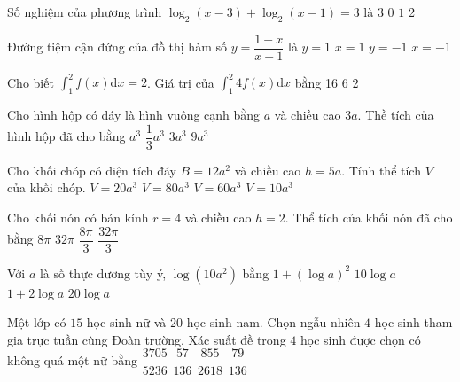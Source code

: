 \begin{ex} %
 Số nghiệm của phương trình $\log _{2}(x-3)+\log _{2}(x-1)=3$ là
\choice
{3}
{0}
{\True $1$}
{2}
\end{ex}

\begin{ex} %
 Đường tiệm cận đứng của đồ thị hàm số $y=\dfrac{1-x}{x+1}$ là
\choice
{$y=1$}
{$x=1$}
{$y=-1$}
{\True$x=-1$}
\end{ex}

\begin{ex} %
 Cho biết $\int_{1}^{2} f(x) \mathrm{d} x=2$. Giá trị của $\int_{1}^{2} 4 f(x) \mathrm{d} x$ bằng
\choice
{}
{16}
{6}
{2}
\end{ex}

\begin{ex} %
 Cho hình hộp có đáy là hình vuông cạnh bằng $a$ và chiều cao $3 a$. Thề tích của hình hộp đã cho bằng
\choice
{$a^{3}$}
{$\dfrac{1}{3} a^{3}$}
{\True $3 a^{3}$}
{$9 a^{3}$}
\end{ex}

\begin{ex} %
 Cho khối chóp có diện tích đáy $B=12 a^{2}$ và chiều cao $h=5 a$. Tính thể tích $V$ của khối chóp.
\choice
{\True $V=20 a^{3}$}
{$V=80 a^{3}$}
{$V=60 a^{3}$}
{$V=10 a^{3}$}
\end{ex}

\begin{ex} %
 Cho khối nón có bán kính $r=4$ và chiều cao $h=2$. Thể tích của khối nón đã cho bằng
\choice
{$8 \pi$}
{$32 \pi$}
{$\dfrac{8 \pi}{3}$}
{\True$\dfrac{32 \pi}{3}$}
\end{ex}

\begin{ex} %
 Với $a$ là số thực dương tùy ý, $\log \left(10 a^{2}\right)$ bằng
\choice
{$1+(\log a)^{2}$}
{$10 \log a$}
{\True$1+2 \log a$}
{$20 \log a$}
\end{ex}

\begin{ex} %
 Một lớp có $15$ học sinh nữ và $ 20$ học sinh nam. Chọn ngẫu nhiên $4$ học sinh tham gia trực tuần cùng Đoàn trường. Xác suất đề trong $4$ học sinh được chọn có không quá một nữ bằng 
\choice
{$\dfrac{3705}{5236}$}
{\True$\dfrac{57}{136}$}
{$\dfrac{855}{2618}$}
{$\dfrac{79}{136}$}
\end{ex}

